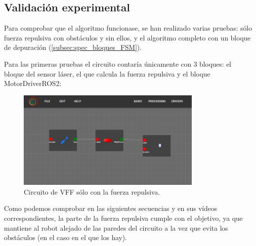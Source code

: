 \subsection{Validación experimental}
\label{subsec:val_exp_VFF}
Para comprobar que el algoritmo funcionase, se han realizado varias pruebas: sólo fuerza repulsiva con obstáculos y sin ellos, y el algoritmo completo con un
bloque de depuración (\ref{subsec:spec_bloques_FSM}).

Para las primeras pruebas el circuito contaría únicamente con 3 bloques: el bloque del sensor láser, el que calcula la fuerza repulsiva y el bloque MotorDriverROS2:

\begin{figure} [H]
    \begin{center}
        \includegraphics[width=9cm]{figs/c6/VFF_r_Circ.png}
    \end{center}
    \caption[Circuito VFF sólo fuerza repulsiva]{Circuito de VFF sólo con la fuerza repulsiva.}
    \label{fig:VFF_r_circ}
\end{figure}

Como podemos comprobar en las siguientes secuencias y en sus vídeos correspondientes, la parte de la fuerza repulsiva cumple con el objetivo, ya que mantiene
al robot alejado de las paredes del circuito a la vez que evita los obstáculos (en el caso en el que los hay).

